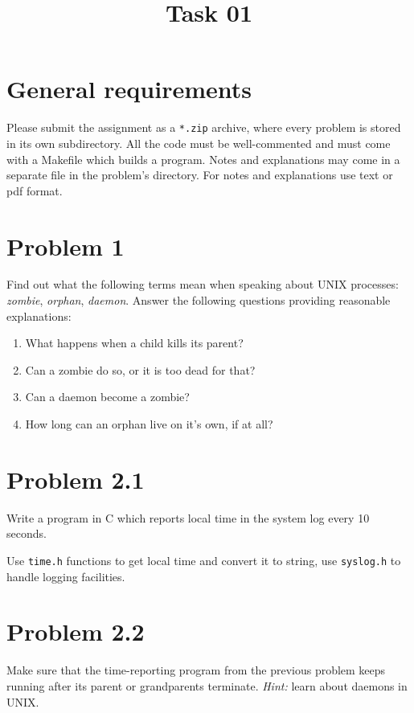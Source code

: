 \documentclass[a4paper,10pt]{scrartcl}
\title{ 
    Task 01
}
\date{}
\begin{document}
    \maketitle
    \thispagestyle{fancy}

    \section*{General requirements}
    Please submit the assignment as a \verb|*.zip| archive, where every problem is stored in
    its own subdirectory.  All the code must be well-commented and must come with a Makefile 
    which builds a program.  Notes and explanations may come in a separate file in the problem's
    directory.  For notes and explanations use text or pdf format.

    \section{Problem 1}
    Find out what the following terms mean when speaking about UNIX processes:
    \textit{zombie}, \textit{orphan}, \textit{daemon}.  
    Answer the following questions providing reasonable explanations:
    \begin{enumerate}
        \item What happens when a child kills its parent?
        \item Can a zombie do so, or it is too dead for that?
        \item Can a daemon become a zombie?
        \item How long can an orphan live on it's own, if at all?
    \end{enumerate}


    \section{Problem 2.1}
    Write a program in C which reports local time in the system log every 10 seconds.  
    
    Use \verb|time.h| functions to get local time and convert it to string, use \verb|syslog.h|
    to handle logging facilities.
    
    \section{Problem 2.2}
    Make sure that the time-reporting program from the previous problem keeps running after its
    parent or grandparents terminate.  \textit{Hint:} learn about daemons in UNIX.
\end{document}
